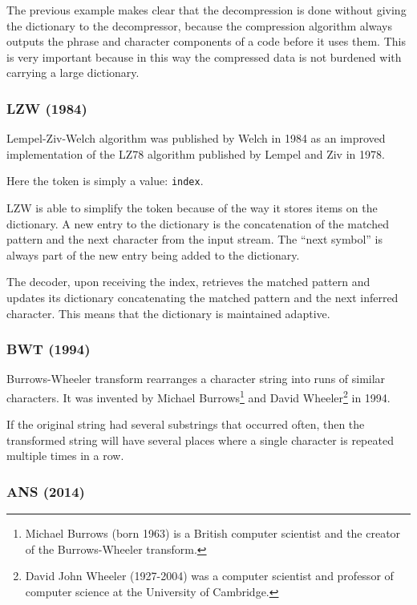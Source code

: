 \documentclass[12pt, a4paper]{report}
\begin{document}
The previous example makes clear that the decompression is done without giving the dictionary to the decompressor, because the
compression algorithm always outputs the phrase and character components of a code before it uses them.
This is very important because in this way the compressed data is not burdened with carrying a large dictionary.

\subsubsection{LZW (1984)}

Lempel-Ziv-Welch algorithm was published by Welch in 1984 as an improved implementation of the LZ78 algorithm published by Lempel
and Ziv in 1978.

Here the token is simply a value: \texttt{index}.

LZW is able to simplify the token because of the way it stores items on the dictionary.
A new entry to the dictionary is the concatenation of the matched pattern and the next character from the input stream.
The ``next symbol'' is always part of the new entry being added to the dictionary.

The decoder, upon receiving the index, retrieves the matched pattern and updates its dictionary concatenating the matched pattern
and the next inferred character. This means that the dictionary is maintained adaptive.

\subsubsection{BWT (1994)}

Burrows-Wheeler transform rearranges a character string into runs of similar characters.
It was invented by Michael Burrows\footnote{Michael Burrows (born 1963) is a British computer scientist and the creator of the
Burrows-Wheeler transform.} and David Wheeler\footnote{David John Wheeler (1927-2004) was a computer scientist and
professor of computer science at the University of Cambridge.} in 1994.

If the original string had several substrings that occurred often, then the transformed string will have several places where a
single character is repeated multiple times in a row.

\subsubsection{ANS (2014)}
\end{document}
